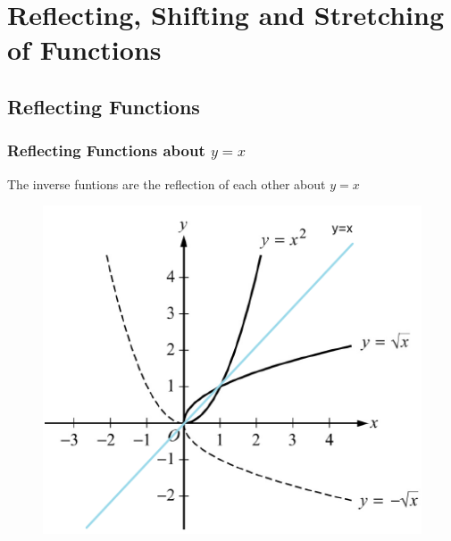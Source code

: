 \documentclass[
	11pt, %
	handout,
]{beamer}
\begin{document}
\section{Reflecting, Shifting and Stretching of Functions}

\subsection{Reflecting Functions}
\begin{frame}
	\frametitle{Reflecting Functions about $y = x$}
	\begin{theorem}[关于$y=x$镜像对称：调换xy]
	The inverse funtions are the reflection of each other about $y = x$
	\end{theorem}

	\begin{figure}
		\includegraphics[width=0.5\linewidth]{Reflection1.png} 
	\end{figure}
\end{frame}

\end{document}
